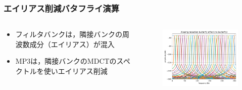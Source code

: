 \documentclass[14pt,xcolor=dvipsnames,table,dvipdfmx]{beamer}
\begin{document}
\begin{frame}[c]
    \frametitle{エイリアス削減バタフライ演算}
    \begin{columns}
        \begin{column}{0.35\textwidth}
            \begin{itemize}
                \item フィルタバンクは，隣接バンクの周波数成分（エイリアス）が混入
                \item MP3は，隣接バンクのMDCTのスペクトルを使いエイリアス削減
            \end{itemize}
        \end{column}
        \begin{column}{0.7\textwidth}
            \begin{figure}
                \includegraphics[width=85mm]{./figs/MP3_aliasing_reduction_butterfly_no_butterfly.pdf}
            \end{figure}
        \end{column}
    \end{columns}
\end{frame}
\end{document}
